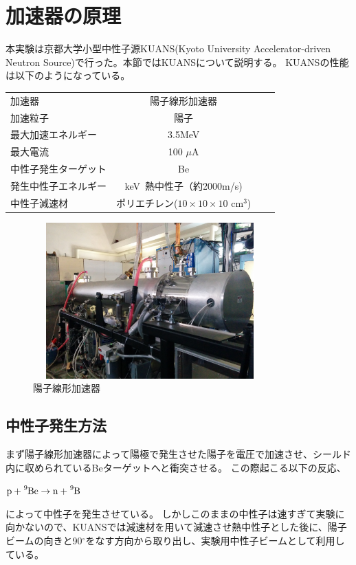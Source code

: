 \begingroup
\section{加速器の原理}
本実験は京都大学小型中性子源KUANS(Kyoto University Accelerator-driven Neutron Source)で行った。本節ではKUANSについて説明する。
KUANSの性能は以下のようになっている。


\begin{table}[htb]\centering
\begin{tabular}{lcrr}
加速器&陽子線形加速器\\
加速粒子&陽子\\
最大加速エネルギー&3.5MeV\\
最大電流&100 $\mu$A \\
中性子発生ターゲット&Be\\
発生中性子エネルギー&keV~熱中性子（約2000m/s)\\
中性子減速材&ポリエチレン($10\times10\times10$ cm$^3$)
\end{tabular}
\end{table}
\begin{figure}[H]
\centering
\includegraphics[width=9cm,height=6cm]{accelerator/accphoto.jpg}
\caption{陽子線形加速器}
\end{figure}

\subsection{中性子発生方法}
まず陽子線形加速器によって陽極で発生させた陽子を電圧で加速させ、シールド内に収められているBeターゲットへと衝突させる。
この際起こる以下の反応、
\begin{center}
$\ce{p} + \ce{^9Be} \to \ce{n} + \ce{^9B}$
\end{center}
によって中性子を発生させている。
しかしこのままの中性子は速すぎて実験に向かないので、KUANSでは減速材を用いて減速させ熱中性子とした後に、陽子ビームの向きと90$^{\circ}$をなす方向から取り出し、実験用中性子ビームとして利用している。
\newpage
